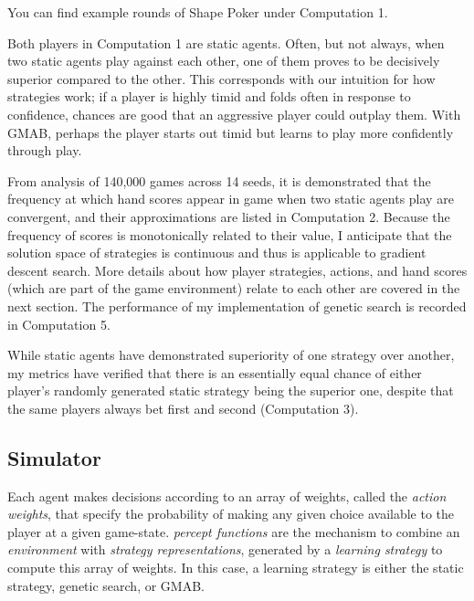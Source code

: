 \documentclass[11pt]{article}
\begin{document}
You can find example rounds of Shape Poker under Computation 1.

Both players in Computation 1 are static agents. Often, but not always, when two static agents play against each other, one of them proves to be decisively superior compared to the other. This corresponds with our intuition for how strategies work; if a player is highly timid and folds often in response to confidence, chances are good that an aggressive player could outplay them. With GMAB, perhaps the player starts out timid but learns to play more confidently through play.

From analysis of 140,000 games across 14 seeds, it is demonstrated that the frequency at which hand scores appear in game when two static agents play are convergent, and their approximations are listed in Computation 2. Because the frequency of scores is monotonically related to their value, I anticipate that the solution space of strategies is continuous and thus is applicable to gradient descent search. More details about how player strategies, actions, and hand scores (which are part of the game environment) relate to each other are covered in the next section. The performance of my implementation of genetic search is recorded in Computation 5.


While static agents have demonstrated superiority of one strategy over another, my metrics have verified that there is an essentially equal chance of either player's randomly generated static strategy being the superior one, despite that the same players always bet first and second (Computation 3).


\subsection{Simulator}

Each agent makes decisions according to an array of weights, called the \textit{action weights}, that specify the probability of making any given choice available to the player at a given game-state. \textit{percept functions} are the mechanism to combine an \textit{environment} with \textit{strategy representations}, generated by a \textit{learning strategy} to compute this array of weights. In this case, a learning strategy is either the static strategy, genetic search, or GMAB.
\end{document}
